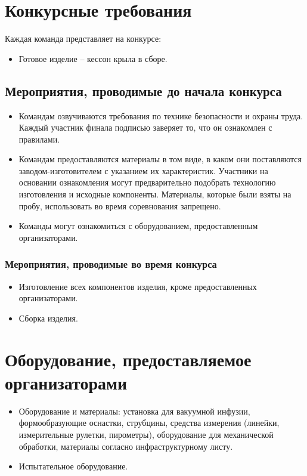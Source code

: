 \section{Конкурсные требования}

Каждая команда представляет на конкурсе:
\begin{itemize}
    \item Готовое изделие – кессон крыла в сборе.
\end{itemize} 

\subsection*{Мероприятия, проводимые до начала конкурса}
\begin{itemize}
    \item Командам озвучиваются требования по технике безопасности и охраны труда. Каждый участник финала подписью заверяет то, что он ознакомлен с правилами.
    \item Командам предоставляются материалы в том виде, в каком они поставляются заводом-изготовителем с указанием их характеристик. Участники на основании ознакомления могут предварительно подобрать технологию изготовления и исходные компоненты. Материалы, которые были взяты на пробу, использовать во время соревнования запрещено.
    \item Команды могут ознакомиться с оборудованием, предоставленным организаторами.
\end{itemize}

\subsubsection*{Мероприятия, проводимые во время конкурса}
\begin{itemize}
    \item Изготовление всех компонентов изделия, кроме предоставленных организаторами.
    \item Сборка изделия.
\end{itemize}

\section{Оборудование, предоставляемое организаторами}
\begin{itemize}
    \item Оборудование и материалы: установка для вакуумной инфузии, формообразующие оснастки, струбцины, средства измерения (линейки, измерительные рулетки, пирометры), оборудование для механической обработки, материалы согласно инфраструктурному листу.
    \item Испытательное оборудование.
\end{itemize}

